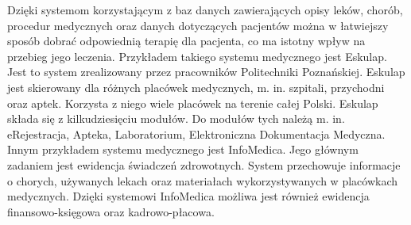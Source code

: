 \begin{spacing}{1.5}
Dzięki systemom korzystającym z baz danych zawierających opisy leków, chorób, procedur medycznych oraz danych dotyczących pacjentów można w łatwiejszy sposób dobrać odpowiednią terapię dla pacjenta, co ma istotny wpływ na przebieg jego leczenia. 
Przykładem takiego systemu medycznego jest Eskulap. Jest to system zrealizowany przez pracowników Politechniki Poznańskiej. Eskulap jest skierowany dla różnych placówek medycznych, m. in. szpitali, przychodni oraz aptek. Korzysta z niego wiele placówek na terenie całej Polski. Eskulap składa się z kilkudziesięciu modułów. Do modułów tych należą m. in. eRejestracja, Apteka, Laboratorium, Elektroniczna Dokumentacja Medyczna. Innym przykładem systemu medycznego jest InfoMedica. Jego głównym zadaniem jest ewidencja świadczeń zdrowotnych. System przechowuje informacje o chorych, używanych lekach oraz materiałach wykorzystywanych w placówkach medycznych. Dzięki systemowi InfoMedica możliwa jest również ewidencja finansowo-księgowa oraz kadrowo-płacowa. 


\end{spacing}
